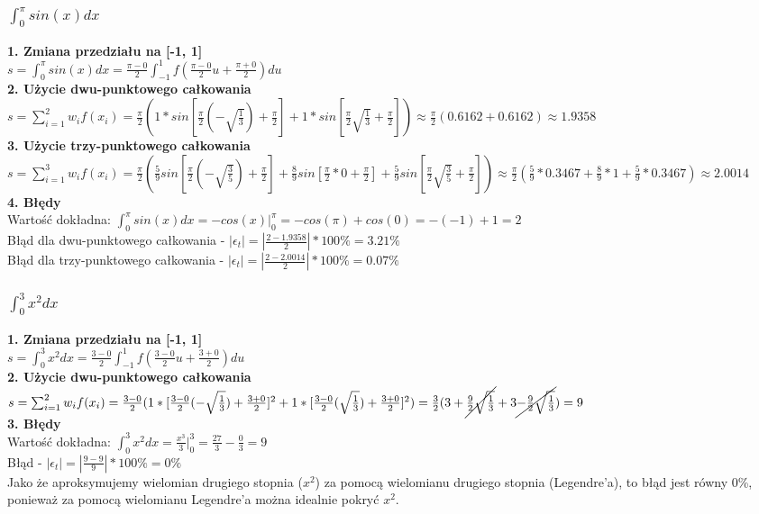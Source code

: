 \documentclass{article}
\begin{document}
\subsubsection{$\int_{0}^{\pi}sin(x)dx$}
\textbf{1. Zmiana przedziału na [-1, 1]}\\
$s=\int_{0}^{\pi}sin(x)dx=\frac{\pi-0}{2}\int_{-1}^{1}f(\frac{\pi-0}{2}u+\frac{\pi+0}{2})du$\\
\textbf{2. Użycie dwu-punktowego całkowania}\\
$s=\sum_{i=1}^{2}w_if(x_i)=\frac{\pi}{2}(1*sin[\frac{\pi}{2}(-\sqrt{\frac{1}{3}})+\frac{\pi}{2}]+1*sin[\frac{\pi}{2}\sqrt{\frac{1}{3}}+\frac{\pi}{2}])\approx\frac{\pi}{2}(0.6162+0.6162)\approx1.9358$\\
\textbf{3. Użycie trzy-punktowego całkowania}\\
$s=\sum_{i=1}^{3}w_if(x_i)=\frac{\pi}{2}(\frac{5}{9}sin[\frac{\pi}{2}(-\sqrt{\frac{3}{5}})+\frac{\pi}{2}]+\frac{8}{9}sin[\frac{\pi}{2}*0+\frac{\pi}{2}]+\frac{5}{9}sin[\frac{\pi}{2}\sqrt{\frac{3}{5}}+\frac{\pi}{2}])\approx\frac{\pi}{2}(\frac{5}{9}*0.3467+\frac{8}{9}*1+\frac{5}{9}*0.3467)\approx2.0014$\\
\textbf{4. Błędy}\\
Wartość dokładna: $\int_{0}^{\pi}sin(x)dx=-cos(x)|^\pi_0=-cos(\pi)+cos(0)=-(-1)+1=2$\\
Błąd dla dwu-punktowego całkowania - $|\epsilon_t| = |\frac{2-1.9358}{2}|*100\% = 3.21\%$\\
Błąd dla trzy-punktowego całkowania - $|\epsilon_t| = |\frac{2-2.0014}{2}|*100\% = 0.07\%$

\subsubsection{$\int_{0}^{3}x^2dx$}
\textbf{1. Zmiana przedziału na [-1, 1]}\\
$s=\int_{0}^{3}x^2dx=\frac{3-0}{2}\int_{-1}^{1}f(\frac{3-0}{2}u+\frac{3+0}{2})du$\\
\textbf{2. Użycie dwu-punktowego całkowania}\\
$s=\sum_{i=1}^{2}w_if(x_i)=\frac{3-0}{2}(1*[\frac{3-0}{2}(-\sqrt{\frac{1}{3}})+\frac{3+0}{2}]^2+1*[\frac{3-0}{2}(\sqrt{\frac{1}{3}})+\frac{3+0}{2}]^2)=\frac{3}{2}(3+\cancel{\frac{9}{2}\sqrt{\frac{1}{3}}}+3\cancel{-\frac{9}{2}\sqrt{\frac{1}{3}}})=9$\\
\textbf{3. Błędy}\\
Wartość dokładna: $\int_{0}^{3}x^2dx=\frac{x^3}{3}|^3_0=\frac{27}{3}-\frac{0}{3}=9$\\
Błąd - $|\epsilon_t| = |\frac{9-9}{9}|*100\% = 0\%$\\
Jako że aproksymujemy wielomian drugiego stopnia ($x^2$) za pomocą wielomianu drugiego stopnia (Legendre'a), to błąd jest równy 0\%, ponieważ za pomocą wielomianu Legendre'a można idealnie pokryć $x^2$.\\
\end{document}

